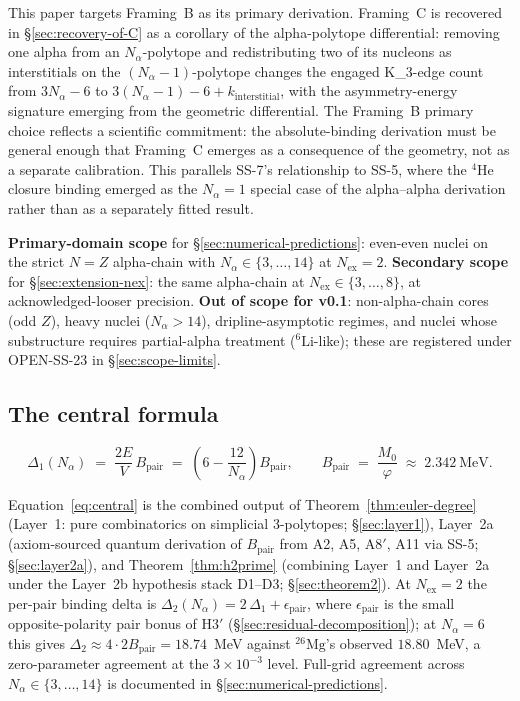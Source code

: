 \documentclass[11pt,letterpaper]{article}
\theoremstyle{definition}
\newcommand{\Mzero}{M_0}
\newcommand{\phig}{\varphi}
\newcommand{\Bpair}{B_{\text{pair}}}
\newcommand{\Nalpha}{N_\alpha}
\newcommand{\Nex}{N_{\text{ex}}}
\newcommand{\Kthree}{K_3}
\begin{document}
This paper targets Framing~B as its primary derivation. Framing~C is recovered in \S\ref{sec:recovery-of-C} as a corollary of the alpha-polytope differential: removing one alpha from an $\Nalpha$-polytope and redistributing two of its nucleons as interstitials on the $(\Nalpha - 1)$-polytope changes the engaged \Kthree-edge count from $3\Nalpha - 6$ to $3(\Nalpha - 1) - 6 + k_{\text{interstitial}}$, with the asymmetry-energy signature emerging from the geometric differential. The Framing~B primary choice reflects a scientific commitment: the absolute-binding derivation must be general enough that Framing~C emerges as a consequence of the geometry, not as a separate calibration. This parallels SS-7's relationship to SS-5, where the ${}^{4}\mathrm{He}$ closure binding emerged as the $\Nalpha = 1$ special case of the alpha--alpha derivation rather than as a separately fitted result.

\textbf{Primary-domain scope} for \S\ref{sec:numerical-predictions}: even-even nuclei on the strict $N = Z$ alpha-chain with $\Nalpha \in \{3, \ldots, 14\}$ at $\Nex = 2$. \textbf{Secondary scope} for \S\ref{sec:extension-nex}: the same alpha-chain at $\Nex \in \{3, \ldots, 8\}$, at acknowledged-looser precision. \textbf{Out of scope for v0.1}: non-alpha-chain cores (odd $Z$), heavy nuclei ($\Nalpha > 14$), dripline-asymptotic regimes, and nuclei whose substructure requires partial-alpha treatment (${}^{6}\mathrm{Li}$-like); these are registered under OPEN-SS-23 in \S\ref{sec:scope-limits}.

\subsection{The central formula}
\label{sec:central-formula}

\begin{equation}
  \boxed{\;\Delta_1(\Nalpha) \;=\; \frac{2E}{V}\,\Bpair \;=\; \left(6 - \frac{12}{\Nalpha}\right)\Bpair, \qquad \Bpair \;=\; \frac{\Mzero}{\phig} \;\approx\; 2.342~\mathrm{MeV}.\;}
  \label{eq:central}
\end{equation}

Equation~\eqref{eq:central} is the combined output of Theorem~\ref{thm:euler-degree} (Layer~1: pure combinatorics on simplicial 3-polytopes; \S\ref{sec:layer1}), Layer~2a (axiom-sourced quantum derivation of $\Bpair$ from A2, A5, A8$'$, A11 via SS-5; \S\ref{sec:layer2a}), and Theorem~\ref{thm:h2prime} (combining Layer~1 and Layer~2a under the Layer~2b hypothesis stack D1--D3; \S\ref{sec:theorem2}). At $\Nex = 2$ the per-pair binding delta is $\Delta_2(\Nalpha) = 2\,\Delta_1 + \epsilon_{\text{pair}}$, where $\epsilon_{\text{pair}}$ is the small opposite-polarity pair bonus of H3$'$ (\S\ref{sec:residual-decomposition}); at $\Nalpha = 6$ this gives $\Delta_2 \approx 4 \cdot 2\Bpair = 18.74$~MeV against ${}^{26}\mathrm{Mg}$'s observed $18.80$~MeV, a zero-parameter agreement at the $3 \times 10^{-3}$ level. Full-grid agreement across $\Nalpha \in \{3, \ldots, 14\}$ is documented in \S\ref{sec:numerical-predictions}.
\end{document}
